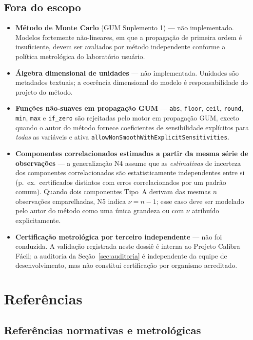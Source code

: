 \documentclass[11pt,a4paper]{article}
\newcommand{\organizationName}{Projeto Calibra Fácil}
\begin{document}
\subsection{Fora do escopo}

\begin{itemize}
  \item \textbf{Método de Monte Carlo} (GUM Suplemento 1) --- não implementado. Modelos fortemente não-lineares, em que a propagação de primeira ordem é insuficiente, devem ser avaliados por método independente conforme a política metrológica do laboratório usuário.
  \item \textbf{Álgebra dimensional de unidades} --- não implementada. Unidades são metadados textuais; a coerência dimensional do modelo é responsabilidade do projeto do método.
  \item \textbf{Funções não-suaves em propagação GUM} --- \texttt{abs}, \texttt{floor}, \texttt{ceil}, \texttt{round}, \texttt{min}, \texttt{max} e \texttt{if\_zero} são rejeitadas pelo motor em propagação GUM, exceto quando o autor do método fornece coeficientes de sensibilidade explícitos para \emph{todas} as variáveis e ativa \texttt{allowNonSmoothWithExplicitSensitivities}.
  \item \textbf{Componentes correlacionados estimados a partir da mesma série de observações} --- a generalização N4 assume que as \emph{estimativas} de incerteza dos componentes correlacionados são estatisticamente independentes entre si (p.~ex.\ certificados distintos com erros correlacionados por um padrão comum). Quando dois componentes Tipo~A derivam das mesmas \(n\) observações emparelhadas, N5 indica \(\nu = n - 1\); esse caso deve ser modelado pelo autor do método como uma única grandeza ou com \(\nu\) atribuído explicitamente.
  \item \textbf{Certificação metrológica por terceiro independente} --- não foi conduzida. A validação registrada neste dossiê é interna ao \organizationName{}; a auditoria da Seção~\ref{sec:auditoria} é independente da equipe de desenvolvimento, mas não constitui certificação por organismo acreditado.
\end{itemize}

\section{Referências}
\label{sec:referencias}

\subsection{Referências normativas e metrológicas}
\end{document}
